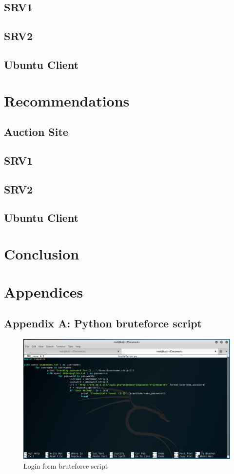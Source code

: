 \documentclass{report}
\begin{document}
\section{SRV1}
\section{SRV2}
\section{Ubuntu Client}

\chapter{Recommendations}
\section{Auction Site}
\section{SRV1}
\section{SRV2}
\section{Ubuntu Client}

\chapter{Conclusion}

\chapter{Appendices}
\section{Appendix A: Python bruteforce script}
\begin{figure}[!htb]
	\centering
	\includegraphics[scale=0.4]{img/bruteforcescript.png}
	\caption{Login form bruteforce script}
\end{figure}
\end{document}
